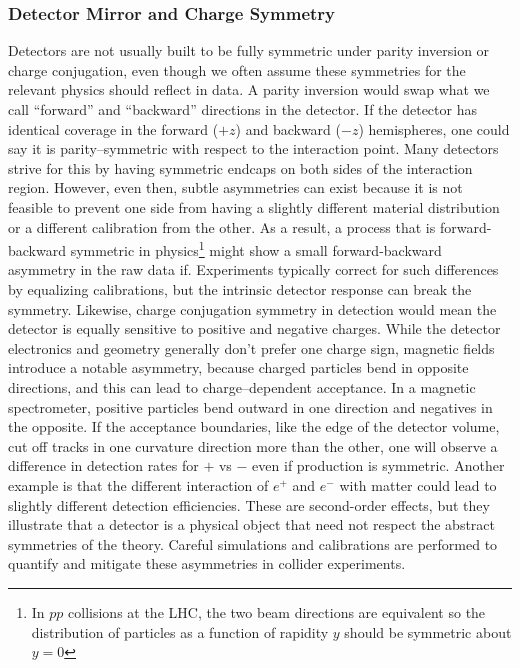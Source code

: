         \subsubsection{Detector Mirror and Charge Symmetry}
            Detectors are not usually built to be fully symmetric under parity inversion or charge conjugation, even though we often assume these symmetries for the relevant physics should reflect in data.
            A parity inversion would swap what we call “forward” and “backward” directions in the detector.
            If the detector has identical coverage in the forward ($+z$) and backward ($-z$) hemispheres, one could say it is parity--symmetric with respect to the interaction point.
            Many detectors strive for this by having symmetric endcaps on both sides of the interaction region.
            However, even then, subtle asymmetries can exist because it is not feasible to prevent one side from having a slightly different material distribution or a different calibration from the other.
            As a result, a process that is forward-backward symmetric in physics\footnote{In $pp$ collisions at the LHC, the two beam directions are equivalent so the distribution of particles as a function of rapidity $y$ should be symmetric about $y=0$} might show a small forward-backward asymmetry in the raw data if.
            Experiments typically correct for such differences by equalizing calibrations, but the intrinsic detector response can break the symmetry.
            Likewise, charge conjugation symmetry in detection would mean the detector is equally sensitive to positive and negative charges.
            While the detector electronics and geometry generally don’t prefer one charge sign, magnetic fields introduce a notable asymmetry, because charged particles bend in opposite directions, and this can lead to charge--dependent acceptance.
            In a magnetic spectrometer, positive particles bend outward in one direction and negatives in the opposite.
            If the acceptance boundaries, like the edge of the detector volume, cut off tracks in one curvature direction more than the other, one will observe a difference in detection rates for $+$ vs $-$ even if production is symmetric. %
            Another example is that the different interaction of $e^+$ and $e^-$ with matter could lead to slightly different detection efficiencies.
            These are second-order effects, but they illustrate that a detector is a physical object that need not respect the abstract symmetries of the theory.
            Careful simulations and calibrations are performed to quantify and mitigate these asymmetries in collider experiments.

